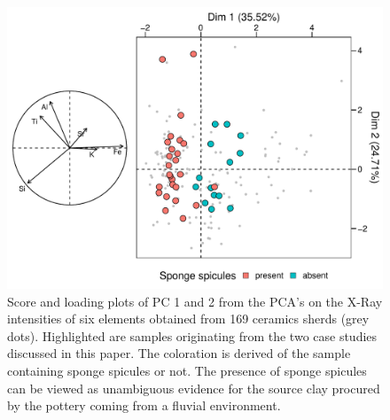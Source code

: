 \documentclass[a4paper]{article}
\begin{document}
\begin{figure}[H]
	\centering
	\includegraphics[width=.8\textwidth]{Fig_XRF_pca_clay_origin.pdf}
	\caption{Score and loading plots of PC 1 and 2 from the PCA's on the X-Ray intensities of six elements obtained from 169 ceramics sherds (grey dots). Highlighted are samples originating from the two case studies discussed in this paper. The coloration is derived of the sample containing sponge spicules or not. The presence of sponge spicules can be viewed as unambiguous evidence for the source clay procured by the pottery coming from a fluvial environment.}
	\label{fig:xrf.pca.clay.origins}
\end{figure}
\end{document}
